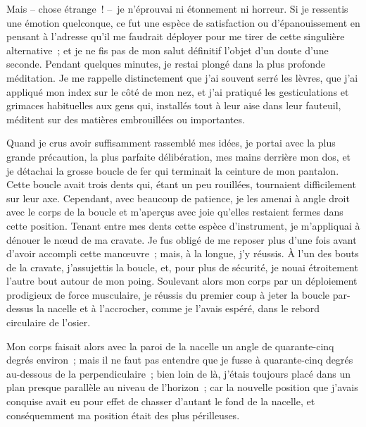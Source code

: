\documentclass[french,twoside]{book} %
\begin{document}
Mais – chose étrange ! – je n’éprouvai ni étonnement ni horreur. Si je ressentis une émotion quelconque, ce fut une espèce de satisfaction ou d’épanouissement en pensant à l’adresse qu’il me faudrait déployer pour me tirer de cette singulière alternative ; et je ne fis pas de mon salut définitif l’objet d’un doute d’une seconde. Pendant quelques minutes, je restai plongé dans la plus profonde méditation. Je me rappelle distinctement que j’ai souvent serré les lèvres, que j’ai appliqué mon index sur le côté de mon nez, et j’ai pratiqué les gesticulations et grimaces habituelles aux gens qui, installés tout à leur aise dans leur fauteuil, méditent sur des matières embrouillées ou importantes.\par
Quand je crus avoir suffisamment rassemblé mes idées, je portai avec la plus grande précaution, la plus parfaite délibération, mes mains derrière mon dos, et je détachai la grosse boucle de fer qui terminait la ceinture de mon pantalon. Cette boucle avait trois dents qui, étant un peu rouillées, tournaient difficilement sur leur axe. Cependant, avec beaucoup de patience, je les amenai à angle droit avec le corps de la boucle et m’aperçus avec joie qu’elles restaient fermes dans cette position. Tenant entre mes dents cette espèce d’instrument, je m’appliquai à dénouer le nœud de ma cravate. Je fus obligé de me reposer plus d’une fois avant d’avoir accompli cette manœuvre ; mais, à la longue, j’y réussis. À l’un des bouts de la cravate, j’assujettis la boucle, et, pour plus de sécurité, je nouai étroitement l’autre bout autour de mon poing. Soulevant alors mon corps par un déploiement prodigieux de force musculaire, je réussis du premier coup à jeter la boucle par-dessus la nacelle et à l’accrocher, comme je l’avais espéré, dans le rebord circulaire de l’osier.\par
Mon corps faisait alors avec la paroi de la nacelle un angle de quarante-cinq degrés environ ; mais il ne faut pas entendre que je fusse à quarante-cinq degrés au-dessous de la perpendiculaire ; bien loin de là, j’étais toujours placé dans un plan presque parallèle au niveau de l’horizon ; car la nouvelle position que j’avais conquise avait eu pour effet de chasser d’autant le fond de la nacelle, et conséquemment ma position était des plus périlleuses.\par
\end{document}
